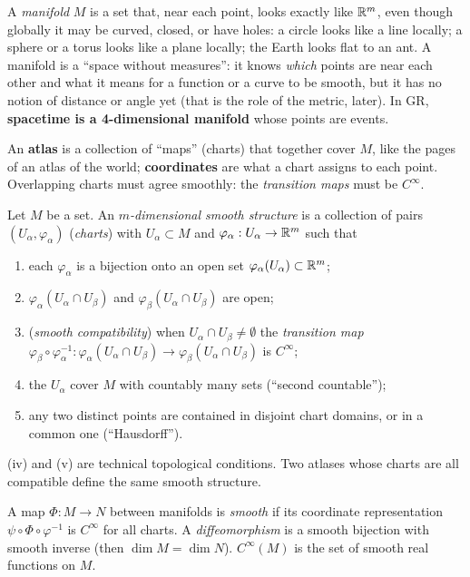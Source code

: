 \begin{intuition}
A \emph{manifold} $M$ is a set that, near each point, looks exactly like $\mathbb{R}^m$, even though globally it may be curved, closed, or have holes: a circle looks like a line locally; a sphere or a torus looks like a plane locally; the Earth looks flat to an ant. A manifold is a ``space without measures'': it knows \emph{which} points are near each other and what it means for a function or a curve to be smooth, but it has no notion of distance or angle yet (that is the role of the metric, later). In GR, \textbf{spacetime is a 4-dimensional manifold} whose points are events.

An \textbf{atlas} is a collection of ``maps'' (charts) that together cover $M$, like the pages of an atlas of the world; \textbf{coordinates} are what a chart assigns to each point. Overlapping charts must agree smoothly: the \emph{transition maps} must be $C^\infty$.
\end{intuition}

\begin{formal}
Let $M$ be a set. An \emph{$m$-dimensional smooth structure} is a collection of pairs $(U_\alpha,\varphi_\alpha)$ (\emph{charts}) with $U_\alpha\subset M$ and $\varphi_\alpha:U_\alpha\to\mathbb{R}^m$ such that
\begin{enumerate}[label=(\roman*),nosep]
\item each $\varphi_\alpha$ is a bijection onto an open set $\varphi_\alpha(U_\alpha)\subset\mathbb{R}^m$;
\item $\varphi_\alpha(U_\alpha\cap U_\beta)$ and $\varphi_\beta(U_\alpha\cap U_\beta)$ are open;
\item (\emph{smooth compatibility}) when $U_\alpha\cap U_\beta\ne\emptyset$ the \emph{transition map}
$\varphi_\beta\circ\varphi_\alpha^{-1}:\varphi_\alpha(U_\alpha\cap U_\beta)\to\varphi_\beta(U_\alpha\cap U_\beta)$ is $C^\infty$;
\item the $U_\alpha$ cover $M$ with countably many sets (``second countable'');
\item any two distinct points are contained in disjoint chart domains, or in a common one (``Hausdorff'').
\end{enumerate}
(iv) and (v) are technical topological conditions. Two atlases whose charts are all compatible define the same smooth structure.

A map $\Phi:M\to N$ between manifolds is \emph{smooth} if its coordinate representation $\psi\circ\Phi\circ\varphi^{-1}$ is $C^\infty$ for all charts. A \emph{diffeomorphism} is a smooth bijection with smooth inverse (then $\dim M=\dim N$). $C^\infty(M)$ is the set of smooth real functions on $M$.
\end{formal}

